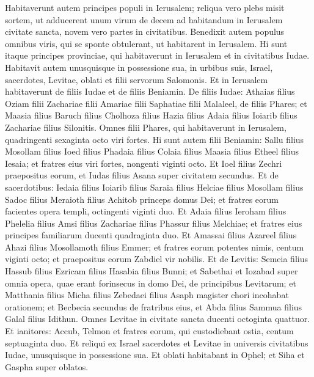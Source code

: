 \begin{biblechapter}
\begin{biblechapter}
\begin{biblechapter}
\begin{biblechapter}
\begin{biblechapter}
\begin{biblechapter}
\begin{biblechapter}
\begin{biblechapter}
\begin{biblechapter}
\begin{biblechapter}
\begin{biblechapter}
\verse Habitaverunt autem principes populi in Ierusalem; reliqua vero plebs misit sortem, ut adducerent unum virum de decem ad habitandum in Ierusalem civitate sancta, novem vero partes in civitatibus. 
\verse Benedixit autem populus omnibus viris, qui se sponte obtulerant, ut habitarent in Ierusalem. 
\verse Hi sunt itaque principes provinciae, qui habitaverunt in Ierusalem et in civitatibus Iudae. Habitavit autem unusquisque in possessione sua, in urbibus suis, Israel, sacerdotes, Levitae, oblati et filii servorum Salomonis.
 \verse Et in Ierusalem habitaverunt de filiis Iudae et de filiis Beniamin. De filiis Iudae: Athaias filius Oziam filii Zachariae filii Amariae filii Saphatiae filii Malaleel, de filiis Phares; 
\verse et Maasia filius Baruch filius Cholhoza filius Hazia filius Adaia filius Ioiarib filius Zachariae filius Silonitis. 
\verse Omnes filii Phares, qui habitaverunt in Ierusalem, quadringenti sexaginta octo viri fortes.
 \verse Hi sunt autem filii Beniamin: Sallu filius Mosollam filius Ioed filius Phadaia filius Colaia filius Maasia filius Etheel filius Iesaia; 
\verse et fratres eius viri fortes, nongenti viginti octo. 
\verse Et Ioel filius Zechri praepositus eorum, et Iudas filius Asana super civitatem secundus.
 \verse Et de sacerdotibus: Iedaia filius Ioiarib filius 
\verse Saraia filius Helciae filius Mosollam filius Sadoc filius Meraioth filius Achitob princeps domus Dei; 
\verse et fratres eorum facientes opera templi, octingenti viginti duo. Et Adaia filius Ieroham filius Phelelia filius Amsi filius Zachariae filius Phassur filius Melchiae; 
\verse et fratres eius principes familiarum ducenti quadraginta duo. Et Amassai filius Azareel filius Ahazi filius Mosollamoth filius Emmer; 
 \verse et fratres eorum potentes nimis, centum viginti octo; et praepositus eorum Zabdiel vir nobilis.
 \verse Et de Levitis: Semeia filius Hassub filius Ezricam filius Hasabia filius Bunni; 
\verse et Sabethai et Iozabad super omnia opera, quae erant forinsecus in domo Dei, de principibus Levitarum; 
\verse et Matthania filius Micha filius Zebedaei filius Asaph magister chori incohabat orationem; et Becbecia secundus de fratribus eius, et Abda filius Sammua filius Galal filius Idithun. 
\verse Omnes Levitae in civitate sancta ducenti octoginta quattuor.
 \verse Et ianitores: Accub, Telmon et fratres eorum, qui custodiebant ostia, centum septuaginta duo.
 \verse Et reliqui ex Israel sacerdotes et Levitae in universis civitatibus Iudae, unusquisque in possessione sua. 
\verse Et oblati habitabant in Ophel; et Siha et Gaspha super oblatos.

\end{biblechapter}
\end{biblechapter}
\end{biblechapter}
\end{biblechapter}
\end{biblechapter}
\end{biblechapter}
\end{biblechapter}
\end{biblechapter}
\end{biblechapter}
\end{biblechapter}
\end{biblechapter}
